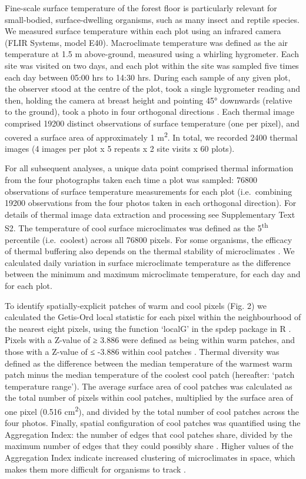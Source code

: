 \documentclass[12pt,a4paper,]{report}
\theoremstyle{definition}
\theoremstyle{definition}
\theoremstyle{definition}
\theoremstyle{remark}
\begin{document}
Fine-scale surface temperature of the forest floor is particularly
relevant for small-bodied, surface-dwelling organisms, such as many
insect and reptile species. We measured surface temperature within each
plot using an infrared camera (FLIR Systems, model E40). Macroclimate
temperature was defined as the air temperature at 1.5 m above-ground,
measured using a whirling hygrometer. Each site was visited on two days,
and each plot within the site was sampled five times each day between
05:00 hrs to 14:30 hrs. During each sample of any given plot, the
observer stood at the centre of the plot, took a single hygrometer
reading and then, holding the camera at breast height and pointing 45°
downwards (relative to the ground), took a photo in four orthogonal
directions \citep{scheffers_extreme2017}. Each thermal image comprised
19200 distinct observations of surface temperature (one per pixel), and
covered a surface area of approximately 1 m\textsuperscript{2}. In
total, we recorded 2400 thermal images (4 images per plot x 5 repeats x
2 site visits x 60 plots).

For all subsequent analyses, a unique data point comprised thermal
information from the four photographs taken each time a plot was
sampled: 76800 observations of surface temperature measurements for each
plot (i.e.~combining 19200 observations from the four photos taken in
each orthogonal direction). For details of thermal image data extraction
and processing see Supplementary Text S2. The temperature of cool
surface microclimates was defined as the 5\textsuperscript{th}
percentile (i.e.~coolest) across all 76800 pixels. For some organisms,
the efficacy of thermal buffering also depends on the thermal stability
of microclimates \citep{shi_framework2016}. We calculated daily
variation in surface microclimate temperature as the difference between
the minimum and maximum microclimate temperature, for each day and for
each plot.

To identify spatially-explicit patches of warm and cool pixels (Fig. 2)
we calculated the Getis-Ord local statistic for each pixel within the
neighbourhood of the nearest eight pixels, using the function `localG'
in the spdep package in R
\citep{bivand_comparing2015, r_core_team_r:2017}. Pixels with a Z-value
of ≥ 3.886 were defined as being within warm patches, and those with a
Z-value of ≤ -3.886 within cool patches \citep{getis_local1996}. Thermal
diversity was defined as the difference between the median temperature
of the warmest warm patch minus the median temperature of the coolest
cool patch (hereafter: `patch temperature range'). The average surface
area of cool patches was calculated as the total number of pixels within
cool patches, multiplied by the surface area of one pixel (0.516
cm\textsuperscript{2}), and divided by the total number of cool patches
across the four photos. Finally, spatial configuration of cool patches
was quantified using the Aggregation Index: the number of edges that
cool patches share, divided by the maximum number of edges that they
could possibly share \citep{he_aggregation2000, caillon_warming2014}.
Higher values of the Aggregation Index indicate increased clustering of
microclimates in space, which makes them more difficult for organisms to
track \citep{sears_configuration2016}.
\end{document}
